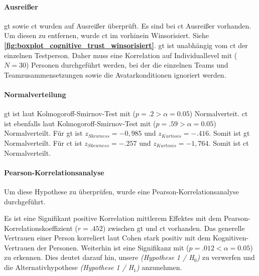 \documentclass[a4paper,11pt]{article}%
\renewcommand{\\}{\vspace*{0.5\baselineskip} \newline}
\begin{document}
\paragraph{Ausreißer}
\ac{gt} sowie \ac{ct} wurden auf Ausreißer überprüft. 
Es sind bei \ac{ct} Ausreißer vorhanden. Um diesen zu entfernen, wurde \ac{ct} im vorhinein Winsorisiert. Siehe \textbf{\autoref{fig:boxplot_cognitive_trust_winsorisiert}}. 
\ac{gt} ist unabhängig vom \ac{ct} der einzelnen Testperson. Daher muss eine Korrelation auf Individuallevel mit ($N=30$) Personen durchgeführt werden, bei der die einzelnen Teams und Teamzusammensetzungen sowie die Avatarkonditionen ignoriert werden. 

\paragraph{Normalverteilung}
\ac{gt} ist laut Kolmogoroff-Smirnov-Test mit ($p = .2 > \alpha = 0.05$) Normalverteit. 
\ac{ct} ist ebenfalls laut Kolmogoroff-Smirnov-Test mit ($p = .59 > \alpha = 0.05$) Normalverteilt. 
Für \ac{gt} ist $ z_{Skewness} = -0,985 $ und $z_{Kurtosis} = -.416$. Somit ist \ac{gt} Normalverteilt.
Für \ac{ct} ist $ z_{Skewness} = -.257 $ und $z_{Kurtosis} = -1,764$. Somit ist \ac{ct} Normalverteilt.


\paragraph{Pearson-Korrelationsanalyse}
Um diese Hypothese zu überprüfen, wurde eine Pearson-Korrelationsanalyse durchgeführt. 

	
Es ist eine Signifikant positive Korrelation mittlerem Effektes mit dem Pearson-Korrelationskoeffizient ($r = .452$) zwischen \ac{gt} und \ac{ct} vorhanden. 
Das generelle Vertrauen einer Person korreliert  laut Cohen \cite{cohen2013statistical} stark positiv mit dem Kognitiven-Vertrauen der Personen.
Weiterhin ist eine Signifikanz mit ($p = .012 < \alpha = 0.05$) zu erkennen. Dies deutet darauf hin, unsere \textit{(Hypothese 1 / H$_{0}$)} zu verwerfen und die Alternativhypothese \textit{(Hypothese 1 / H$_{1}$)} anzunehmen.
\end{document}
